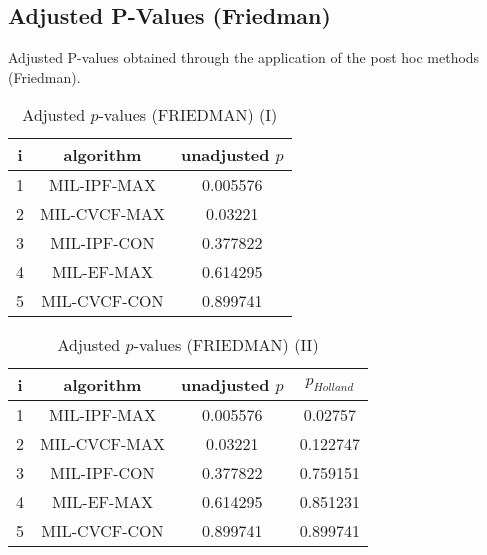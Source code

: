 \documentclass[a4paper,10pt]{article}
\begin{document}
\begin{landscape}
\newpage

\section{Adjusted P-Values (Friedman)}


Adjusted P-values obtained through the application of the post hoc methods (Friedman).

\begin{table}[!htp]
\centering\small
\begin{tabular}{ccc}
i&algorithm&unadjusted $p$\\
\hline1&MIL-IPF-MAX&0.005576\\2&MIL-CVCF-MAX&0.03221\\3&MIL-IPF-CON&0.377822\\4&MIL-EF-MAX&0.614295\\5&MIL-CVCF-CON&0.899741\\\hline
\end{tabular}
\caption{Adjusted $p$-values (FRIEDMAN) (I)}
\end{table}
\begin{table}[!htp]
\centering\small
\begin{tabular}{cccc}
i&algorithm&unadjusted $p$&$p_{Holland}$\\
\hline1&MIL-IPF-MAX&0.005576&0.02757\\2&MIL-CVCF-MAX&0.03221&0.122747\\3&MIL-IPF-CON&0.377822&0.759151\\4&MIL-EF-MAX&0.614295&0.851231\\5&MIL-CVCF-CON&0.899741&0.899741\\\hline
\end{tabular}
\caption{Adjusted $p$-values (FRIEDMAN) (II)}
\end{table}

\newpage
\end{landscape}
\end{document}
